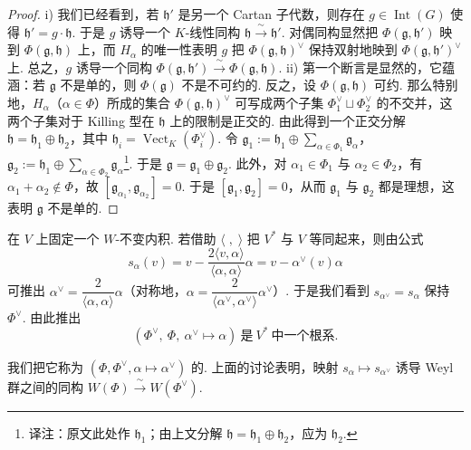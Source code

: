 \begin{proof}
i) 我们已经看到，若 $\mathfrak h'$ 是另一个 Cartan 子代数，则存在 $g\in\operatorname{Int}(G)$ 使得 $\mathfrak h'=g\cdot\mathfrak h$. 于是 $g$ 诱导一个 $K$-线性同构 $\mathfrak h\xrightarrow{\ \sim\ }\mathfrak h'$. 对偶同构显然把 $\Phi(\mathfrak g,\mathfrak h')$ 映到 $\Phi(\mathfrak g,\mathfrak h)$ 上，而 $H_{\alpha}$ 的唯一性表明 $g$ 把 $\Phi(\mathfrak g,\mathfrak h)^{\vee}$ 保持双射地映到 $\Phi(\mathfrak g,\mathfrak h')^{\vee}$ 上. 总之，$g$ 诱导一个同构 $\Phi(\mathfrak g,\mathfrak h')\xrightarrow{\ \sim\ }\Phi(\mathfrak g,\mathfrak h)$.
ii) 第一个断言是显然的，它蕴涵：若 $\mathfrak g$ 不是单的，则 $\Phi(\mathfrak g)$ 不是不可约的. 反之，设 $\Phi(\mathfrak g,\mathfrak h)$ 可约. 那么特别地，$H_{\alpha}$（$\alpha\in\Phi$）所成的集合 $\Phi(\mathfrak g,\mathfrak h)^{\vee}$ 可写成两个子集 $\Phi^{\vee}_1\sqcup\Phi^{\vee}_2$ 的不交并，这两个子集对于 Killing 型在 $\mathfrak h$ 上的限制是正交的. 由此得到一个正交分解 $\mathfrak h=\mathfrak h_1\oplus\mathfrak h_2$，其中 $\mathfrak h_i=\operatorname{Vect}_{K}(\Phi^{\vee}_i)$. 令 $\mathfrak g_1:=\mathfrak h_1\oplus\sum_{\alpha\in\Phi_1}\mathfrak g_{\alpha}$，$\mathfrak g_2:=\mathfrak h_1\oplus\sum_{\alpha\in\Phi_2}\mathfrak g_{\alpha}$\footnote{译注：原文此处作 $\mathfrak h_1$；由上文分解 $\mathfrak h=\mathfrak h_1\oplus\mathfrak h_2$，应为 $\mathfrak h_2$.}. 于是 $\mathfrak g=\mathfrak g_1\oplus\mathfrak g_2$. 此外，对 $\alpha_1\in\Phi_1$ 与 $\alpha_2\in\Phi_2$，有 $\alpha_1+\alpha_2\notin\Phi$，故 $[\mathfrak g_{\alpha_1},\mathfrak g_{\alpha_2}]=0$. 于是 $[\mathfrak g_1,\mathfrak g_2]=0$，从而 $\mathfrak g_1$ 与 $\mathfrak g_2$ 都是理想，这表明 $\mathfrak g$ 不是单的.
\end{proof}
\begin{numpara}[对偶]\label{np:ssl-3-2-4}
在 $V$ 上固定一个 $W$-不变内积. 若借助 $\langle\;,\;\rangle$ 把 $V^{*}$ 与 $V$ 等同起来，则由公式
\[s_{\alpha}(v)=v-\frac{2\langle v,\alpha\rangle}{\langle\alpha,\alpha\rangle}\alpha=v-\alpha^{\vee}(v)\alpha\]
可推出 $\alpha^{\vee}=\dfrac{2}{\langle\alpha,\alpha\rangle}\alpha$（对称地，$\alpha=\dfrac{2}{\langle\alpha^{\vee},\alpha^{\vee}\rangle}\alpha^{\vee}$）. 于是我们看到 $s_{\alpha^{\vee}}=s_{\alpha}$ 保持 $\Phi^{\vee}$. 由此推出
\[(\Phi^{\vee},\ \Phi,\ \alpha^{\vee}\mapsto\alpha)\ \text{是}\ V^{*}\ \text{中一个根系}.\]
\end{numpara}
我们把它称为 $(\Phi,\Phi^{\vee},\alpha\mapsto\alpha^{\vee})$ 的. 上面的讨论表明，映射 $s_{\alpha}\mapsto s_{\alpha^{\vee}}$ 诱导 Weyl 群之间的同构 $W(\Phi)\xrightarrow{\ \sim\ }W(\Phi^{\vee})$.
